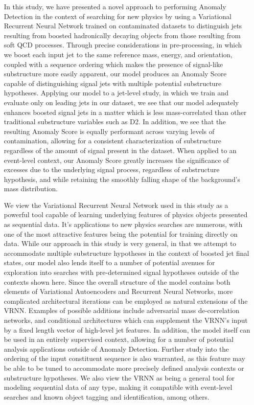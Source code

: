 \documentclass[12pt, a4paper]{article}
\begin{document}
In this study, we have presented a novel approach to performing Anomaly Detection in the context of searching for new physics by using a Variational Recurrent Neural Network trained on contaminated datasets to distinguish jets resulting from boosted hadronically decaying objects from those resulting from soft QCD processes. Through precise considerations in pre-processing, in which we boost each input jet to the same reference mass, energy, and orientation, coupled with a sequence ordering which makes the presence of signal-like substructure more easily apparent, our model produces an Anomaly Score capable of distinguishing signal jets with multiple potential substructure hypotheses. Applying our model to a jet-level study, in which we train and evaluate only on leading jets in our dataset, we see that our model adequately enhances boosted signal jets in a matter which is less mass-correlated than other traditional substructure variables such as D2. In addition, we see that the resulting Anomaly Score is equally performant across varying levels of contamination, allowing for a consistent characterization of substructure regardless of the amount of signal present in the dataset. When applied to an event-level context, our Anomaly Score greatly increases the significance of excesses due to the underlying signal process, regardless of substructure hypothesis, and while retaining the smoothly falling shape of the background's mass distribution.

We view the Variational Recurrent Neural Network used in this study as a powerful tool capable of learning underlying features of physics objects presented as sequential data. It's applications to new physics searches are numerous, with one of the most attractive features being the potential for training directly on data. While our approach in this study is very general, in that we attempt to accommodate multiple substructure hypotheses in the context of boosted jet final states, our model also lends itself to a number of potential avenues for exploration into searches with pre-determined signal hypotheses outside of the contexts shown here. Since the overall structure of the model contains both elements of Variational Autoencoders and Recurrent Neural Networks, more complicated architectural iterations can be employed as natural extensions of the VRNN. Examples of possible additions include adversarial mass de-correlation networks, and conditional architectures which can supplement the VRNN's input by a fixed length vector of high-level jet features. In addition, the model itself can be used in an entirely supervised context, allowing for a number of potential analysis applications outside of Anomaly Detection. Further study into the ordering of the input constituent sequence is also warranted, as this feature may be able to be tuned to accommodate more precisely defined analysis contexts or substructure hypotheses. We also view the VRNN as being a general tool for modeling sequential data of any type, making it compatible with event-level searches and known object tagging and identification, among others.
\end{document}
